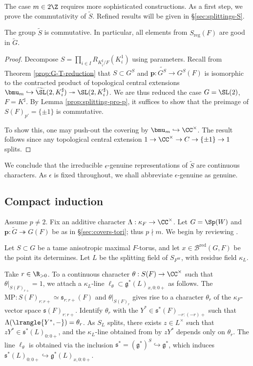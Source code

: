 \documentclass[a4paper,10pt]{article}
\begin{document}
The case $m \in 2\Z$ requires more sophisticated constructions. As a first step, we prove the commutativity of $\tilde{S}$. Refined results will be given in \S\ref{sec:splittings-S}.
\begin{proposition}\label{prop:splitting-even-coarse}
	The group $\tilde{S}$ is commutative. In particular, all elements from $S_\mathrm{reg}(F)$ are good in $\tilde{G}$.
\end{proposition}
\begin{proof}
	Decompose $S = \prod_{i \in I} R_{K_i^\sharp / F} (K_i^1)$ using parameters. Recall from Theorem \ref{prop:G-T-reduction} that $S \subset G^S$ and $\bm{p}: \widetilde{G^S} \to G^S(F)$ is isomorphic to the contracted product of topological central extensions $\bmu_m \hookrightarrow \widetilde{\SL}(2, K_i^\sharp) \twoheadrightarrow \SL(2, K_i^\sharp)$. We are thus reduced the case $G = \SL(2)$, $F = K^\sharp$. By Lemma \ref{prop:splitting-pro-p}, it suffices to show that the preimage of $S(F)_{p'} = \{\pm 1\}$ is commutative.
	
	To show this, one may push-out the covering by $\bmu_m \hookrightarrow \CC^\times$. The result follows since any topological central extension $1 \to \CC^\times \to C \to \{\pm 1\} \to 1$ splits.
\end{proof}

We conclude that the irreducible $\epsilon$-genuine representations of $\tilde{S}$ are continuous characters. As $\epsilon$ is fixed throughout, we shall abbreviate $\epsilon$-genuine as genuine.

\subsection{Compact induction}\label{sec:compact-induction}
Assume $p \neq 2$. Fix an additive character $\Lambda: \kappa_F \to \CC^\times$. Let $G = \Sp(W)$ and $\bm{p}: \tilde{G} \twoheadrightarrow G(F)$ be as in \S\ref{sec:covers-tori}; thus $p \nmid m$. We begin by reviewing \cite[\S 3.2]{Kal15}.

Let $S \subset G$ be a tame anisotropic maximal $F$-torus, and let $x \in \mathcal{B}^\text{red}(G,F)$ be the point its determines. Let $L$ be the splitting field of $S_{F^\text{nr}}$, with residue field $\kappa_L$.

Take $r \in \R_{> 0}$. To a continuous character $\theta: S(F) \to \CC^\times$ such that $\theta|_{S(F)_{r+}} = 1$, we attach a $\kappa_L$-line $\ell_\theta \subset \mathfrak{g}^*(L)_{x,0:0+}$ as follows. The $\mathrm{MP}: S(F)_{r:r+} \simeq \mathfrak{s}_{r:r+}(F)$ and $\theta|_{S(F)_r}$ gives rise to a character $\theta_r$ of the $\kappa_F$-vector space $\mathfrak{s}(F)_{r:r+}$. Identify $\theta_r$ with the $Y^* \in \mathfrak{s}^*(F)_{-r:(-r)+}$ such that $\Lambda(\lrangle{Y^*, -}) = \theta_r$. As $S_L$ splits, there exists $z \in L^\times$ such that $zY^* \in \mathfrak{s}^*(L)_{0:0+}$, and the $\kappa_L$-line obtained from by $zY^*$ depends only on $\theta_r$. The line $\ell_\theta$ is obtained via the inclusion $\mathfrak{s}^* = (\mathfrak{g}^*)^S \hookrightarrow \mathfrak{g}^*$, which induces $\mathfrak{s}^*(L)_{0:0+} \hookrightarrow \mathfrak{g}^*(L)_{x, 0:0+}$.
\end{document}
